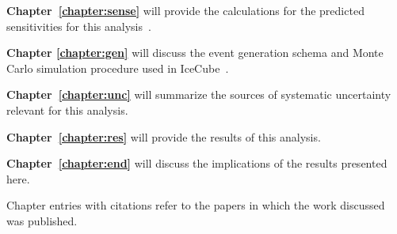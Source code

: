 \documentclass[main.tex]{subfiles}
\begin{document}
\textbf{Chapter~\ref{chapter:sense}} will provide the calculations for the predicted sensitivities for this analysis~\cite{PhysRevD.105.052001}. 

\textbf{Chapter \ref{chapter:gen}} will discuss the event generation schema and Monte Carlo simulation procedure used in IceCube~\cite{ABBASI2021108018}.

\textbf{Chapter~\ref{chapter:unc}} will summarize the sources of systematic uncertainty relevant for this analysis.

\textbf{Chapter~\ref{chapter:res}} will provide the results of this analysis. 

\textbf{Chapter~\ref{chapter:end}} will discuss the implications of the results presented here. 

Chapter entries with citations refer to the papers in which the work discussed was published.
\end{document}
